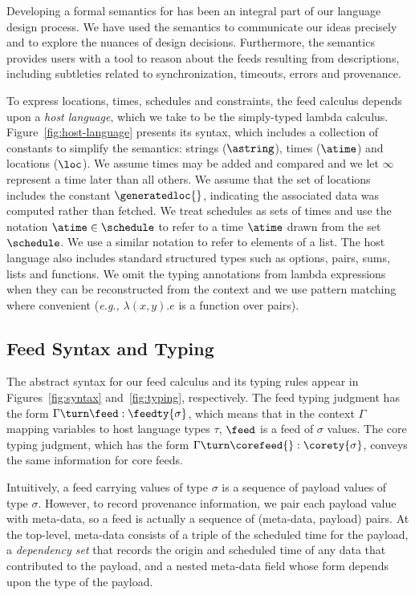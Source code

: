 
Developing a formal semantics for \padsd{} has been an integral part
of our language design process.  We have used the semantics to
communicate our ideas precisely and to explore the nuances of design
decisions. Furthermore, the semantics provides users with a tool to
reason about the feeds resulting from \padsd{} descriptions, including
subtleties related to synchronization, timeouts, errors and provenance.

To express locations, times, schedules and constraints, the feed calculus
depends upon a {\em host language}, which we take to be the
simply-typed lambda calculus.  Figure~\ref{fig:host-language} presents
its syntax, which includes a collection of constants to simplify the
semantics: strings ($\astring$), times ($\atime$) and locations
($\loc$).  We assume times may be added and 
compared and we let $\infty$ represent a time later than all others.
We assume that the set of locations includes the constant
$\generatedloc{}$, indicating the associated data was computed rather
than fetched.
We treat schedules as sets of times and use the notation $\atime
\in \schedule$ to refer to a time $\atime$ drawn from the set
$\schedule$.  We use a similar notation to refer to elements of a
list.  The host language also includes standard structured types such as
options, pairs, sums, lists and functions.
We omit the typing annotations from lambda expressions when they can
be reconstructed from the context and we use pattern matching 
where convenient ({\em e.g.,} $\lambda (x,y).e$ is a function
over pairs).


\subsection{Feed Syntax and Typing}
The abstract syntax for our feed calculus and its typing rules appear
in Figures~\ref{fig:syntax} and~\ref{fig:typing}, respectively.  
The feed typing judgment has the form 
$\Gamma \turn \feed : \feedty{\sigma}$, 
which means that in the context $\Gamma$ mapping variables to host
language types $\tau$, $\feed$ is a feed of $\sigma$ values. 
The core typing judgment, which has the form 
$\Gamma \turn \corefeed{} : \corety{\sigma}$, conveys the same
information for core feeds.



Intuitively, a feed carrying values of type $\sigma$ is a sequence of
payload values of type $\sigma$.  However, to record provenance
information, we pair each payload value with meta-data, so a feed is
actually a sequence of (meta-data, payload) pairs.  At the top-level,
meta-data consists of a triple of the scheduled time for the payload,
a \textit{dependency set} that records the origin and scheduled time of any data
that contributed to the payload, and a nested meta-data field whose
form depends upon the type of the payload.

